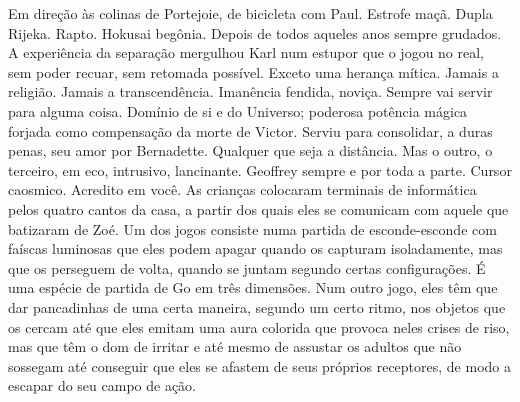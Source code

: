 Em direção às colinas de Portejoie, de bicicleta com Paul. Estrofe maçã.
Dupla Rijeka. Rapto. Hokusai begônia. Depois de todos aqueles anos
sempre grudados. A experiência da separação mergulhou Karl num estupor
que o jogou no real, sem poder recuar, sem retomada possível. Exceto uma
herança mítica. Jamais a religião. Jamais a transcendência. Imanência
fendida, noviça. Sempre vai servir para alguma coisa. Domínio de si e do
Universo; poderosa potência mágica forjada como compensação da morte de
Victor. Serviu para consolidar, a duras penas, seu amor por Bernadette.
Qualquer que seja a distância. Mas o outro, o terceiro, em eco,
intrusivo, lancinante. Geoffrey sempre e por toda a parte. Cursor
caosmico. Acredito em você. As crianças colocaram terminais de
informática pelos quatro cantos da casa, a partir dos quais eles se
comunicam com aquele que batizaram de Zoé. Um dos jogos consiste numa
partida de esconde-esconde com faíscas luminosas que eles podem apagar
quando os capturam isoladamente, mas que os perseguem de volta, quando
se juntam segundo certas configurações. É uma espécie de partida de Go
em três dimensões. Num outro jogo, eles têm que dar pancadinhas de uma
certa maneira, segundo um certo ritmo, nos objetos que os cercam até que
eles emitam uma aura colorida que provoca neles crises de riso, mas que
têm o dom de irritar e até mesmo de assustar os adultos que não sossegam
até conseguir que eles se afastem de seus próprios receptores, de modo a
escapar do seu campo de ação.

